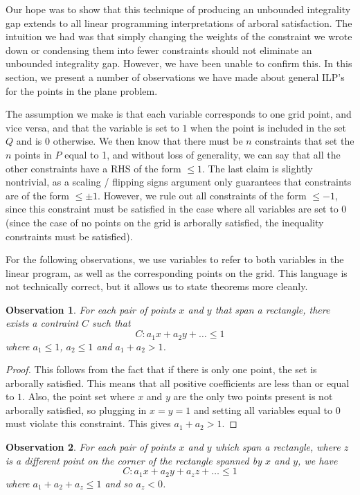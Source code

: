\documentclass[11pt]{article}
\newtheorem{observation}{Observation}
\begin{document}
Our hope was to show that this technique of producing an unbounded integrality gap extends to all linear programming interpretations of arboral satisfaction. The intuition we had was that simply changing the weights of the constraint we wrote down or condensing them into fewer constraints should not eliminate an unbounded integrality gap. However, we have been unable to confirm this. In this section, we present a number of observations we have made about general ILP's for the points in the plane problem. 

The assumption we make is that each variable corresponds to one grid point, and vice versa, and that the variable is set to $1$ when the point is included in the set $Q$ and is 0 otherwise. We then know that there must be $n$ constraints that set the $n$ points in $P$ equal to 1, and without loss of generality, we can say that all the other constraints have a RHS of the form $\leq 1$. The last claim is slightly nontrivial, as a scaling / flipping signs argument only guarantees that constraints are of the form $\leq \pm 1$. However, we rule out all constraints of the form $\leq -1$, since this constraint must be satisfied in the case where all variables are set to 0 (since the case of no points on the grid is arborally satisfied, the inequality constraints must be satisfied). 

For the following observations, we use variables to refer to both variables in the linear program, as well as the corresponding points on the grid. This language is not technically correct, but it allows us to state theorems more cleanly.

\begin{observation}
For each pair of points $x$ and $y$ that span a rectangle, there exists a contraint $C$ such that
\[ C: a_1x + a_2y + \dots \leq 1 \]
where $a_1 \leq 1$, $a_2 \leq 1$ and $a_1 + a_2 > 1$. 
\end{observation}

\begin{proof}
This follows from the fact that if there is only one point, the set is arborally satisfied. This means that all positive coefficients are less than or equal to $1$. Also, the point set where $x$ and $y$ are the only two points present is not arborally satisfied, so plugging in $x = y = 1$ and setting all variables equal to 0 must violate this constraint. This gives $a_1 + a_2 > 1$.
\end{proof}

\begin{observation}
For each pair of points $x$ and $y$ which span a rectangle, where $z$ is a different point on the corner of the rectangle spanned by $x$ and $y$, we have
\[ C: a_1x + a_2y + a_zz + \dots \leq 1 \]
where $a_1 + a_2 + a_z \leq 1$ and so $a_z < 0$.
\end{observation}
\end{document}
